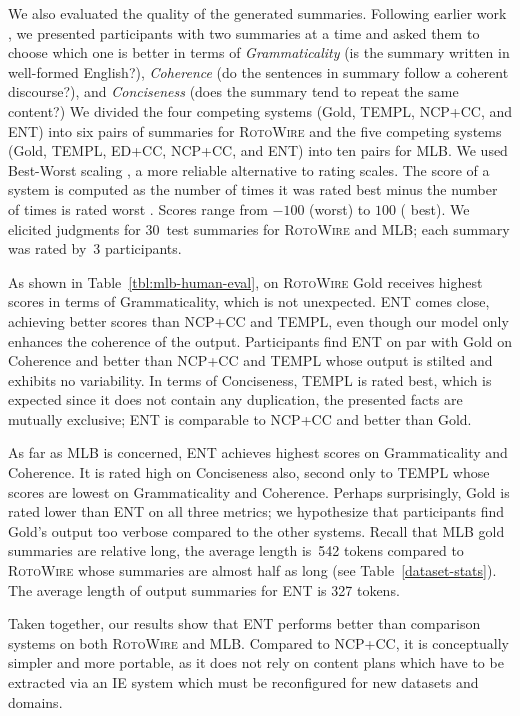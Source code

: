 \documentclass[11pt,a4paper]{article}
\begin{document}
We also evaluated the quality of the generated summaries.  Following
earlier work \cite{DBLP:journals/corr/abs-1809-00582}, we presented
participants with two summaries at a time and asked them to choose
which one is better in terms of \emph{Grammaticality} (is the summary
written in well-formed English?), \emph{Coherence} (do the sentences
in summary follow a coherent discourse?), and \emph{Conciseness} (does
the summary tend to repeat the same content?)  We divided the four
competing systems (Gold, TEMPL, NCP+CC, and ENT) into six pairs
of summaries for \textsc{RotoWire} and the five
competing systems (Gold, TEMPL, ED+CC, NCP+CC, and ENT) into ten pairs
for MLB.
We used Best-Worst scaling \cite{louviere1991best,
  louviere2015best}, a more reliable alternative to rating scales.
The score of a system is computed as the number of times it was rated
best minus the number of times is rated worst \cite{orme2009maxdiff}.
Scores range from $-100$ (worst) to $100$ (
best). We elicited judgments for 30~test summaries for
  \textsc{RotoWire} and MLB; each summary was rated by~3
  participants.


As shown in Table~\ref{tbl:mlb-human-eval}, on \textsc{RotoWire} Gold
receives highest scores in terms of Grammaticality, which is not
unexpected.  ENT comes close, achieving better scores than NCP+CC and
TEMPL, even though our model only enhances the coherence of the
output. Participants find ENT on par with Gold on Coherence and better
than NCP+CC and TEMPL whose output is stilted and exhibits no
variability.  In terms of Conciseness, TEMPL is rated best, which is
expected since it does not contain any duplication, the presented
facts are mutually exclusive; ENT is comparable to NCP+CC and better
than Gold. 


As far as MLB is concerned, ENT achieves highest scores on
Grammaticality and Coherence. It is rated high on Conciseness also,
second only to TEMPL whose scores are lowest on Grammaticality and
Coherence.  Perhaps surprisingly, Gold is rated lower than ENT on all
three metrics; we hypothesize that participants find Gold's output too
verbose compared to the other systems. Recall that MLB gold summaries
are relative long, the average length is~542 tokens compared to
\textsc{RotoWire} whose summaries are almost half as long (see
Table~\ref{dataset-stats}). The average length of 
output summaries for ENT is 327 tokens. 

Taken together, our results show that ENT performs better than
comparison systems on both \textsc{RotoWire} and MLB. Compared to
NCP+CC, it is conceptually simpler and more portable, as it does not
rely on content plans which have to be extracted via an IE system
which must be reconfigured for new datasets and domains.
\end{document}
